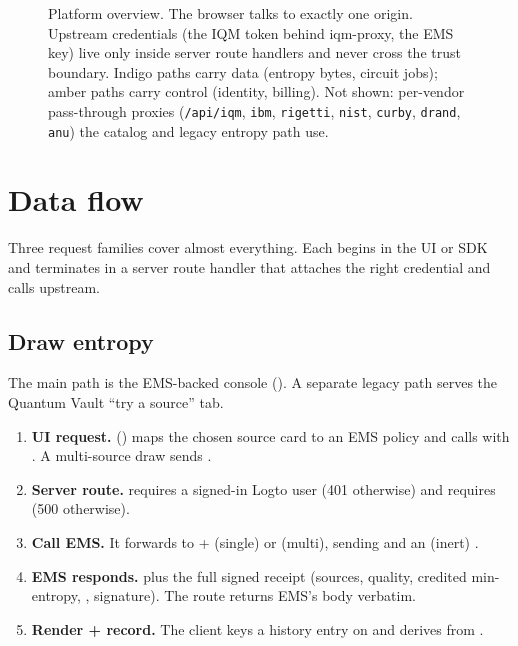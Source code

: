 \documentclass[11pt]{article}
\begin{document}
\begin{figure}[h]
{}
\caption{Platform overview. The browser talks to exactly one origin. Upstream credentials (the IQM token behind
iqm-proxy, the EMS key) live only inside server route handlers and never cross the trust boundary. Indigo paths carry
data (entropy bytes, circuit jobs); amber paths carry control (identity, billing). Not shown: per-vendor pass-through
proxies (\texttt{/api/iqm}, \texttt{ibm}, \texttt{rigetti}, \texttt{nist}, \texttt{curby}, \texttt{drand}, \texttt{anu}) the catalog and legacy
entropy path use.}
\end{figure}

\section{Data flow}
Three request families cover almost everything. Each begins in the UI or SDK and terminates in a server route handler
that attaches the right credential and calls upstream.

\subsection{Draw entropy}
The main path is the EMS-backed console (). A separate legacy path serves the Quantum Vault ``try a
source'' tab.
\begin{enumerate}
\item \textbf{UI request.}  () maps the chosen source card to an EMS
policy and calls  with . A multi-source draw sends
.
\item \textbf{Server route.}  requires a signed-in Logto user (401 otherwise) and requires
 (500 otherwise).
\item \textbf{Call EMS.} It forwards to  +  (single) or 
(multi), sending  and an (inert) .
\item \textbf{EMS responds.}  plus the full signed receipt (sources, quality, credited min-entropy,
, signature). The route returns EMS's body verbatim.
\item \textbf{Render + record.} The client keys a history entry on  and derives 
from .
\end{enumerate}
\end{document}
